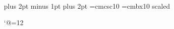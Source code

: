\newcount\notecount
\def\resetnotes{}
\resetnotes
\def\note#1{\advance\notecount by1
    {\eightpoint\footnote{\tenpoint$^{\the\notecount}$\eightpoint}{\eightpoint #1}}}

\def\Section#1{\sectionlevel 1.{#1}}
\def\SubSection#1{\sectionlevel 2.{#1}}
\def\SubSubSection#1{\sectionlevel 3.{#1}}

\parskip=5pt plus 2pt minus 1pt
\topskip=10pt plus 2pt
\font\csc=cmcsc10
\font\twelveb=cmbx10 scaled 
\def\Unix{{\csc Unix{}}}

\def\Month {\ifcase\month Yuletide
\or January
\or February
\or March
\or April
\or May
\or June
\or July
\or August
\or September
\or October
\or November
\or December
\else Randomember \fi}
\def\Year {{\count0=\year \advance\count0 by -1900 \number\count0}}
\def\Date {\Month \number\day, \number\year}
\tenpoint
\catcode`@=12
%
%
